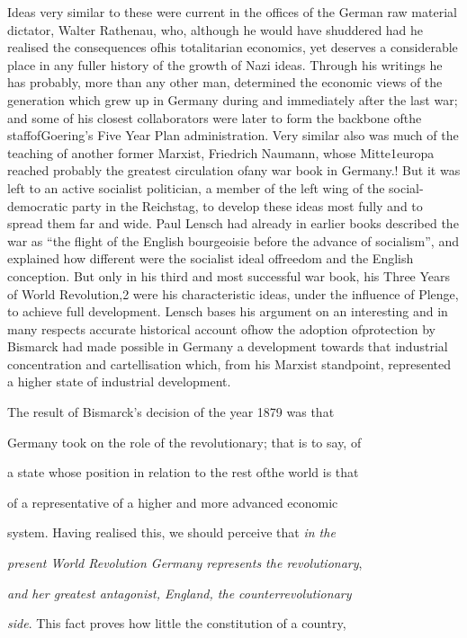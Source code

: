 \documentclass[11pt,openany]{book}
\begin{document}
Ideas very similar to these were current in the offices of the German raw material dictator, Walter Rathenau, who, although he would have shuddered had he realised the consequences ofhis totalitarian economics, yet deserves a considerable place in any fuller history of the growth of Nazi ideas. Through his writings he has probably, more than any other man, determined the economic views of the generation which grew up in Germany during and immediately after the last war; and some of his closest collaborators were later to form the backbone ofthe staffofGoering's Five Year Plan administration. Very similar also was much of the teaching of another former Marxist, Friedrich Naumann, whose Mitte1europa reached probably the greatest circulation ofany war book in Germany.! But it was left to an active socialist politician, a member of the left wing of the social-democratic party in the Reichstag, to develop these ideas most fully and to spread them far and wide. Paul Lensch had already in earlier books described the war as ``the flight of the English bourgeoisie before the advance of socialism'', and explained how different were the socialist ideal offreedom and the English conception. But only in his third and most successful war book, his Three Years of World Revolution,2 were his characteristic ideas, under the influence of Plenge, to achieve full development. Lensch bases his argument on an interesting and in many respects accurate historical account ofhow the adoption ofprotection by Bismarck had made possible in Germany a development towards that industrial concentration and cartellisation which, from his Marxist standpoint, represented a higher state of industrial development.

The result of Bismarck's decision of the year 1879 was that

Germany took on the role of the revolutionary; that is to say, of

a state whose position in relation to the rest ofthe world is that

of a representative of a higher and more advanced economic

system. Having realised this, we should perceive that \emph{in the}

\emph{present World Revolution Germany represents the revolutionary},

\emph{and her greatest antagonist, England, the counterrevolutionary}

\emph{side}. This fact proves how little the constitution of a country,
\end{document}
